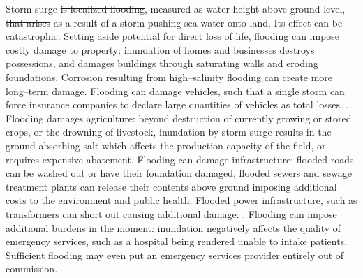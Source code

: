 Storm surge \st{is localized flooding}, measured as water height above
    ground level, \st{that arises}  as a result of a storm pushing sea-water onto
    land. Its effect can be catastrophic.  Setting aside potential 
    for direct loss of life, 
    flooding can impose costly damage to property: inundation of homes and 
    businesses destroys possessions, and damages buildings through saturating 
    walls and eroding foundations.  Corrosion resulting from high--salinity 
    flooding can create more long--term damage.\needcite  
    Flooding can damage vehicles, such that a single storm can force insurance 
    companies to declare large quantities of vehicles as total losses. 
    \needcite.  Flooding damages agriculture: beyond 
    destruction of currently growing or stored crops, or the drowning of 
    livestock, inundation by storm surge results in the ground absorbing salt
    which affects the production capacity of the field, or requires expensive
    abatement.  Flooding can
    damage infrastructure: flooded roads can be washed out or have their 
    foundation damaged, flooded sewers and sewage treatment plants can release 
    their contents above ground imposing additional costs to the environment and
    public health. Flooded power infrastructure, such as transformers can short 
    out causing additional damage. \citep{hutchings2021}.  Flooding can impose 
    additional burdens in the moment:  inundation negatively affects the quality 
    of emergency services, such as a hospital being rendered unable to intake 
    patients.  Sufficient flooding may even put an emergency services provider 
    entirely out of commission.

